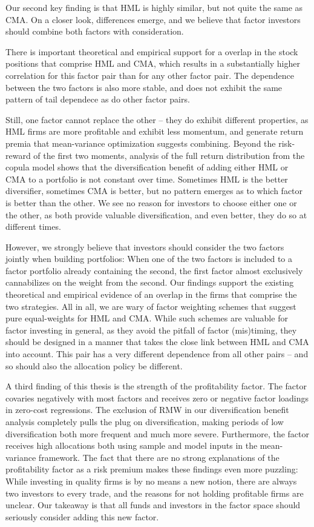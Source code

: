Our second key finding is that HML is highly similar, but not quite the same as CMA. On a closer look, differences emerge, and we believe that factor investors should combine both factors with consideration.

There is important theoretical and empirical support for a overlap in the stock positions that comprise HML and CMA, which results in a substantially higher correlation for this factor pair than for any other factor pair. The dependence between the two factors is also more stable, and does not exhibit the same pattern of tail dependece as do other factor pairs. 

Still, one factor cannot replace the other -- they do exhibit different properties, as HML firms are more profitable and exhibit less momentum, and generate return premia that mean-variance optimization suggests combining. Beyond the risk-reward of the first two moments, analysis of the full return distribution from the copula model shows that the diversification benefit of adding either HML or CMA to a portfolio is not constant over time. Sometimes HML is the better diversifier, sometimes CMA is better, but no pattern emerges as to which factor is better than the other. We see no reason for investors to choose either one or the other, as both provide valuable diversification, and even better, they do so at different times.

However, we strongly believe that investors should consider the two factors jointly when building portfolios: When one of the two factors is included to a factor portfolio already containing the second, the first factor almost exclusively cannabilizes on the weight from the second. Our findings support the existing theoretical and empirical evidence of an overlap in the firms that comprise the two strategies. All in all, we are wary of factor weighting schemes that suggest pure equal-weights for HML and CMA. While such schemes are valuable for factor investing in general, as they avoid the pitfall of factor (mis)timing, they should be designed in a manner that takes the close link between HML and CMA into account. This pair has a very different dependence from all other pairs -- and so should also the allocation policy be different.

A third finding of this thesis is the strength of the profitability factor. The factor covaries negatively with most factors and receives zero or negative factor loadings in zero-cost regressions. The exclusion of RMW in our diversification benefit analysis completely pulls the plug on diversification, making periods of low diversification both more frequent and much more severe. Furthermore, the factor receives high allocations both using sample and model inputs in the mean-variance framework. The fact that there are no strong explanations of the profitability factor as a risk premium makes these findings even more puzzling: While investing in quality firms is by no means a new notion, there are always two investors to every trade, and the reasons for not holding profitable firms are unclear. Our takeaway is that all funds and investors in the factor space should seriously consider adding this new factor.


